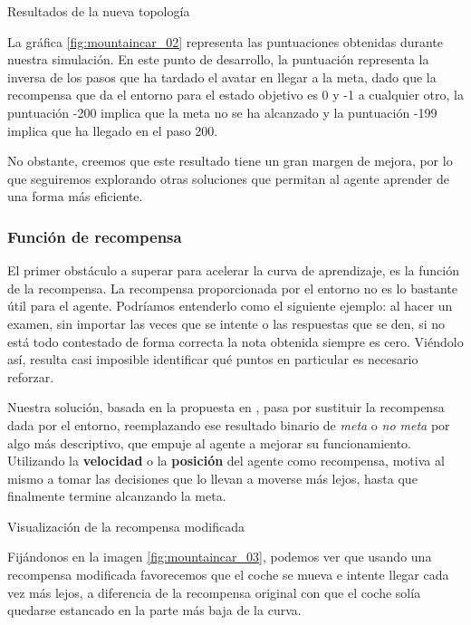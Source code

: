 %
       {Resultados de la nueva topología}

La gráfica \ref{fig:mountaincar_02} representa las puntuaciones obtenidas durante nuestra simulación. En este punto de desarrollo, la puntuación representa la inversa de los pasos que ha tardado el avatar en llegar a la meta, dado que la recompensa que da el entorno para el estado objetivo es 0 y -1 a cualquier otro, la puntuación -200 implica que la meta no se ha alcanzado y la puntuación -199 implica que ha llegado en el paso 200.

No obstante, creemos que este resultado tiene un gran margen de mejora, por lo que seguiremos explorando otras soluciones que permitan al agente aprender de una forma más eficiente.


\subsubsection{Función de recompensa}

El primer obstáculo a superar para acelerar la curva de aprendizaje, es la función de la recompensa. La recompensa proporcionada por el entorno no es lo bastante útil para el agente. Podríamos entenderlo como el siguiente ejemplo: al hacer un examen, sin importar las veces que se intente o las respuestas que se den, si no está todo contestado de forma correcta la nota obtenida siempre es cero. Viéndolo así, resulta casi imposible identificar qué puntos en particular es necesario reforzar.

Nuestra solución, basada en la propuesta en \citep{mediumTim}, pasa por sustituir la recompensa dada por el entorno, reemplazando ese resultado binario de \textit{meta} o \textit{no meta} por algo más descriptivo, que empuje al agente a mejorar su funcionamiento. Utilizando la \textbf{velocidad} o la \textbf{posición} del agente como recompensa, motiva al mismo a tomar las decisiones que lo llevan a moverse más lejos, hasta que finalmente termine alcanzando la meta.

%
       {Visualización de la recompensa modificada}

Fijándonos en la imagen \ref{fig:mountaincar_03}, podemos ver que usando una recompensa modificada favorecemos que el coche se mueva e intente llegar cada vez más lejos, a diferencia de la recompensa original con que el coche solía quedarse estancado en la parte más baja de la curva.

